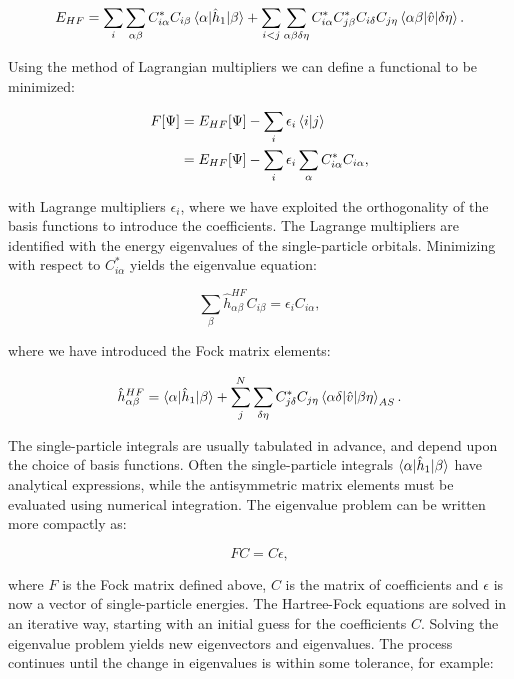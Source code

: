 $$ E_{HF} = \sum_i \sum_{\alpha \beta}
    C_{i \alpha}^* C_{i\beta} \braket{\alpha | \hat{h}_1 | \beta}
    + \sum_{i < j} \sum_{\alpha \beta \delta \eta}
    C_{i\alpha}^* C_{j\beta}^* C_{i\delta} C_{j\eta}
    \braket{\alpha \beta | \hat{v} | \delta \eta} .$$

Using the method of Lagrangian multipliers
we can define a functional to be minimized:

\begin{equation}
\begin{split}
F[\Psi] &= E_{HF}[\Psi] - \sum_i \epsilon_i \braket{i | j} \\
        &= E_{HF}[\Psi] - \sum_i \epsilon_i \sum_{\alpha}
        C_{i\alpha}^* C_{i\alpha} ,
\end{split}
\end{equation}

with Lagrange multipliers $\epsilon_i$, where we have
exploited the orthogonality of the basis functions to
introduce the coefficients. The Lagrange multipliers
are identified with the energy eigenvalues
of the single-particle orbitals.
Minimizing with respect to $C_{i\alpha}^*$ yields
the eigenvalue equation:

\begin{equation}
\sum_{\beta} \hat{h}_{\alpha\beta}^{HF} C_{i\beta}
= \epsilon_i C_{i\alpha} ,
\end{equation}

where we have introduced the Fock matrix elements:

\begin{equation}
\hat{h}_{\alpha\beta}^{HF} = 
\braket{\alpha | \hat{h}_1 | \beta}
+ \sum_{j}^N \sum_{\delta\eta} C_{j\delta}^* C_{j\eta}
\braket{\alpha\delta | \hat{v} | \beta\eta}_{AS} .
\end{equation}

The single-particle integrals are usually tabulated
in advance, and depend upon the choice of basis functions.
Often the single-particle integrals $\braket{\alpha | \hat{h}_1 | \beta}$
have analytical expressions, while the antisymmetric matrix elements
must be evaluated using numerical integration.
The eigenvalue problem can be written more compactly as:

\begin{equation}
FC = C\epsilon ,
\end{equation}

where $F$ is the Fock matrix defined above, $C$ is the matrix
of coefficients and $\epsilon$ is now
a vector of single-particle energies.
The Hartree-Fock equations are solved in an iterative way,
starting with an initial guess for the coefficients $C$.
Solving the eigenvalue problem yields new eigenvectors
and eigenvalues.
The process continues until the change in eigenvalues
is within some tolerance, for example:

